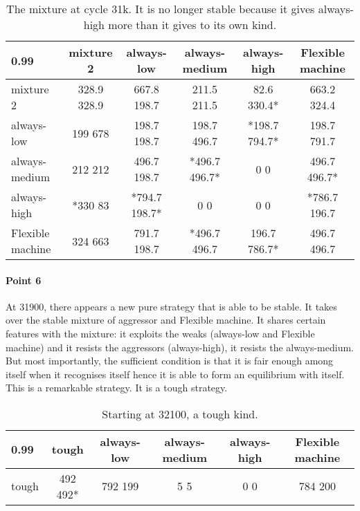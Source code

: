 \documentclass[12.5pt]{report}
\begin{document}
\begin{table}[h!]
\center
\begin{tabular}{l|ccccc}
\textbf{0.99}& mixture 2 & always-low & always-medium & always-high & Flexible machine\\
\hline

mixture 2 & 328.9 328.9  &  667.8 198.7  &  211.5 211.5  &  82.6 330.4* &    663.2 324.4 \\
always-low  &  199 678  &  198.7 198.7  &  198.7 496.7 &  *198.7 794.7* &  198.7 791.7  \\
always-medium   & 212 212  & 496.7 198.7 &  *496.7 496.7*  &     0 0   &     496.7 496.7* \\
always-high   & *330 83  & *794.7 198.7*   &    0 0     &       0 0   &    *786.7 196.7  \\
Flexible machine   & 324 663 &   791.7 198.7 &  *496.7 496.7  &  196.7 786.7*  & 496.7 496.7 \\

\end{tabular}
\caption{The mixture at cycle 31k. It is no longer stable because it gives always-high more than it gives to its own kind.}
\end{table}

\paragraph{Point 6}

At 31900, there appears a new pure strategy that is able to be stable. It takes over the stable mixture of aggressor and Flexible machine. It shares certain features with the mixture: it exploits the weaks (always-low and Flexible machine) and it resists the aggressors (always-high), it resists the always-medium. But most importantly, the sufficient condition is that it is fair enough among itself when it recognises itself hence it is able to form an equilibrium with itself. This is a remarkable strategy. It is a tough strategy.

\begin{table}[h!]
\center
\begin{tabular}{l|ccccc}
\textbf{0.99}& tough & always-low & always-medium & always-high & Flexible machine\\
\hline
tough & 492 492* & 792 199  &  5 5  & 0 0  &  784 200  \\
\end{tabular}
\caption{Starting at 32100, a tough kind.}
\end{table}
\end{document}
